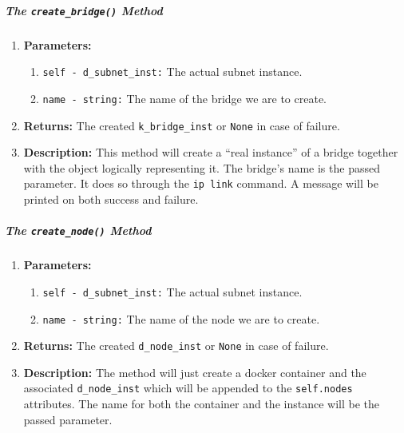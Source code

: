        \subparagraph{The \texttt{create\_bridge()} Method}
            \begin{enumerate}
                \item \textbf{Parameters:}
                \begin{enumerate}
                    \item \texttt{self - d\_subnet\_inst:} The actual subnet instance.
                    \item \texttt{name - string:} The name of the bridge we are to create.
                \end{enumerate}
                \item \textbf{Returns:} The created \texttt{k\_bridge\_inst} or \texttt{None} in case of failure.
                \item \textbf{Description:} This method will create a ``real instance'' of a bridge together with the object logically representing it. The bridge's name is the passed parameter. It does so through the \texttt{ip link} command. A message will be printed on both success and failure.
            \end{enumerate}

        \subparagraph{The \texttt{create\_node()} Method}
            \begin{enumerate}
                \item \textbf{Parameters:}
                \begin{enumerate}
                    \item \texttt{self - d\_subnet\_inst:} The actual subnet instance.
                    \item \texttt{name - string:} The name of the node we are to create.
                \end{enumerate}
                \item \textbf{Returns:} The created \texttt{d\_node\_inst} or \texttt{None} in case of failure.
                \item \textbf{Description:} The method will just create a docker container and the associated \texttt{d\_node\_inst} which will be appended to the \texttt{self.nodes} attributes. The name for both the container and the instance will be the passed parameter.
            \end{enumerate}

